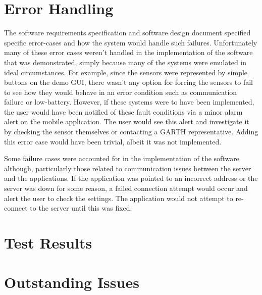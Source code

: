\documentclass{article}
\begin{document}
\section{Error Handling}

The software requirements specification and software design document specified
specific error-cases and how the system would handle such failures.
Unfortunately many of these error cases weren't handled in the implementation
of the software that was demonstrated, simply because many of the systems
were emulated in ideal circumstances. For example, since the sensors were
represented by simple buttons on the demo GUI, there wasn't any option for
forcing the sensors to fail to see how they would behave in an error condition
such as communication failure or low-battery. However, if these systems were to
have been implemented, the user would have been notified of these fault 
conditions via a minor alarm alert on the mobile application. The user would
see this alert and investigate it by checking the sensor themselves or
contacting a GARTH representative. Adding this error case would have been trivial,
albeit it was not implemented.

Some failure cases were accounted for in the implementation of the software
although, particularly those related to communication issues between the server
and the applications. If the application was pointed to an incorrect address or
the server was down for some reason, a failed connection attempt would occur
and alert the user to check the settings. The application would not attempt to
re-connect to the server until this was fixed.

\section{Test Results}

\section{Outstanding Issues} %
\end{document}
